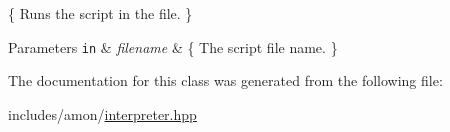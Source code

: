 \{ Runs the script in the file. \} 


\begin{DoxyParams}[1]{Parameters}
\mbox{\tt in}  & {\em filename} & \{ The script file name. \} \\
\hline
\end{DoxyParams}


The documentation for this class was generated from the following file\-:\begin{DoxyCompactItemize}
\item 
includes/amon/\hyperlink{interpreter_8hpp}{interpreter.\-hpp}\end{DoxyCompactItemize}
